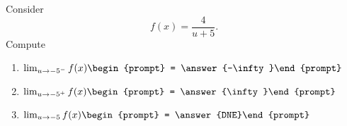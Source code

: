 \documentclass{ximera}
\author{Bart Snapp}
\begin{document}
\begin{exercise}
Consider 
\[
f(x) = \frac{4}{u+5}.
\]
Compute
\begin{enumerate}
\item $\lim_{u\to -5^- } f(x) \begin{prompt} = \answer{-\infty}\end{prompt}$
\item $\lim_{u\to -5^+ } f(x) \begin{prompt} = \answer{\infty}\end{prompt}$
\item $\lim_{u\to -5 } f(x) \begin{prompt} = \answer{DNE}\end{prompt}$
\end{enumerate}
\end{exercise}
\end{document}
